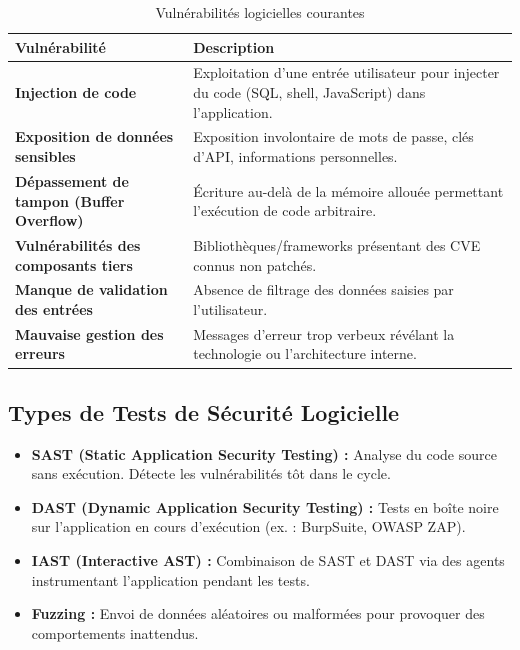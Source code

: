 \begin{table}[H]
\centering
\small
\begin{tabular}{p{4cm}p{8cm}}
    \toprule
    \textbf{Vulnérabilité} & \textbf{Description} \\
    \midrule
    \textbf{Injection de code} & Exploitation d'une entrée utilisateur pour injecter du code (SQL, shell, JavaScript) dans l'application. \\
    \textbf{Exposition de données sensibles} & Exposition involontaire de mots de passe, clés d'API, informations personnelles. \\
    \textbf{Dépassement de tampon (Buffer Overflow)} & Écriture au-delà de la mémoire allouée permettant l'exécution de code arbitraire. \\
    \textbf{Vulnérabilités des composants tiers} & Bibliothèques/frameworks présentant des CVE connus non patchés. \\
    \textbf{Manque de validation des entrées} & Absence de filtrage des données saisies par l'utilisateur. \\
    \textbf{Mauvaise gestion des erreurs} & Messages d'erreur trop verbeux révélant la technologie ou l'architecture interne. \\
    \bottomrule
\end{tabular}
\caption{Vulnérabilités logicielles courantes}
\end{table}

\subsection{Types de Tests de Sécurité Logicielle}

\begin{itemize}
    \item \textbf{SAST (Static Application Security Testing) :} Analyse du code source sans exécution. Détecte les vulnérabilités tôt dans le cycle.
    \item \textbf{DAST (Dynamic Application Security Testing) :} Tests en boîte noire sur l'application en cours d'exécution (ex. : BurpSuite, OWASP ZAP).
    \item \textbf{IAST (Interactive AST) :} Combinaison de SAST et DAST via des agents instrumentant l'application pendant les tests.
    \item \textbf{Fuzzing :} Envoi de données aléatoires ou malformées pour provoquer des comportements inattendus.
\end{itemize}

